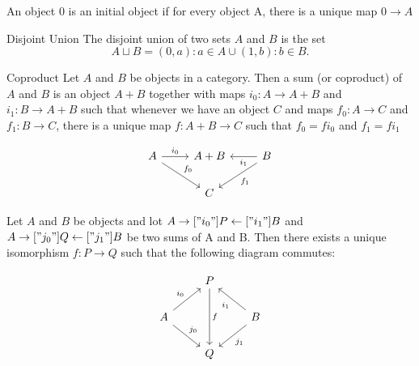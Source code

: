\begin{definition}
  An object $0$ is an initial object if for every object A, there is a unique
  map $ 0 \rightarrow A $
\end{definition}

\begin{definition}{Disjoint Union}
  The disjoint union of two sets $A$ and $B$ is the set 
  $$ A \sqcup B = {(0,a):a \in A} \cup {(1,b):b \in B}. $$
\end{definition}

\begin{definition}{Coproduct}
  Let $A$ and $B$ be objects in a category.
  Then a sum (or coproduct) of $A$ and $B$ is an object $A + B$
  together with maps $i_0 : A \rightarrow A + B $ and $i_1 : B \rightarrow A + B $
  such that whenever we have an object $C$ and maps
  $f_0 : A \rightarrow C$ and $f_1 : B \rightarrow C$, there is a unique map
  $f : A + B \rightarrow C$ such that $f_0 = fi_0 $ and $f_1 = fi_1$

  \[
    \begin{tikzcd}
      A \arrow[dr, "f_0"] \arrow[r, "i_0"] & A + B & \arrow[l, "i_1"] \arrow[dl, "f_1"] B \\
      &   C   & 
    \end{tikzcd}
  \]
  
\end{definition}

\begin{theorem}
  Let $ A $ and $B$ be objects and lot $ A \rightarrow["i_0"] P \leftarrow["i_1"] B $ and
  $ A \rightarrow["j_0"] Q \leftarrow["j_1"] B $ be two sums of A and B.
  Then there exists a unique isomorphism $f:P \rightarrow Q $ such that the following diagram commutes:

  \[
    \begin{tikzcd}
      & P \arrow[dd, "f"] &   \\
      A  \arrow[dr, "j_0"] \arrow[ur, "i_0"]  & & B \arrow[ul, "i_1"] \arrow[dl, "j_1"]\\
      & Q                 &   \\
    \end{tikzcd}
  \]
\end{theorem}
